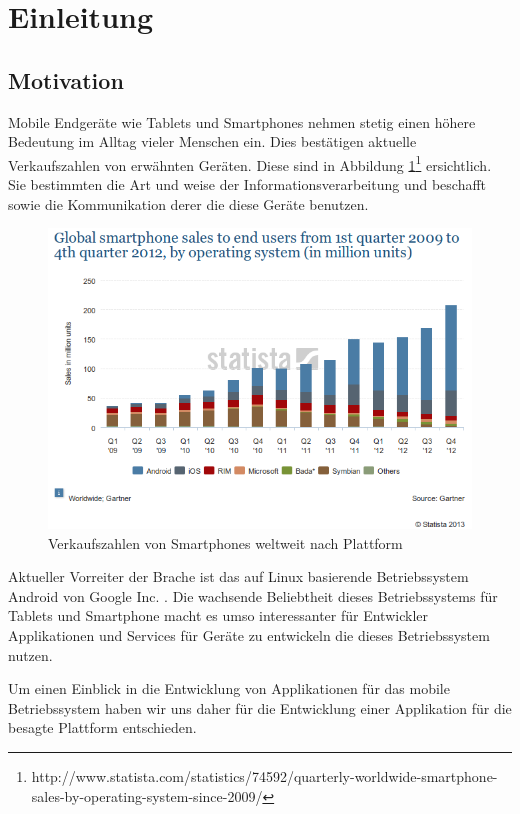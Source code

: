\section{Einleitung}
\subsection{Motivation}
Mobile Endgeräte wie Tablets und Smartphones nehmen stetig einen höhere Bedeutung im Alltag vieler Menschen ein. Dies bestätigen aktuelle Verkaufszahlen von erwähnten Geräten. Diese sind in Abbildung \ref{sale1}\footnote{http://www.statista.com/statistics/74592/quarterly-worldwide-smartphone-sales-by-operating-system-since-2009/} ersichtlich. Sie bestimmten die Art und weise der Informationsverarbeitung und beschafft sowie die Kommunikation derer die diese Geräte benutzen.


\begin{figure}
\begin{center}
\includegraphics[scale=0.6]{images/sale}
\caption{Verkaufszahlen von Smartphones weltweit nach Plattform}
\label{sale1}
\end{center}
\end{figure}


Aktueller Vorreiter der Brache ist das auf Linux basierende Betriebssystem Android von Google Inc. . Die wachsende Beliebtheit dieses Betriebssystems für Tablets und Smartphone macht es umso interessanter für Entwickler Applikationen und Services für Geräte zu entwickeln die dieses Betriebssystem nutzen.

Um einen Einblick in die Entwicklung von Applikationen für das mobile Betriebssystem haben wir uns daher für die Entwicklung einer Applikation für die besagte Plattform entschieden.

